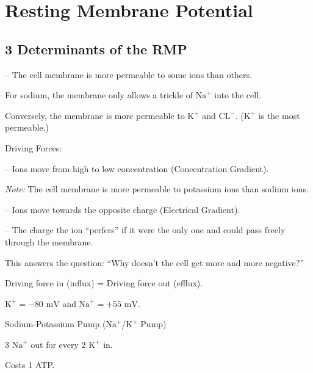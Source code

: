 \section{Resting Membrane Potential}

\subsection{3 Determinants of the RMP}

\begin{coloredlist}
    \item {} -- The cell membrane is more permeable to some ions than others.
    \begin{coloredlist}
        \item For sodium, the membrane only allows a trickle of \(\text{Na}^{+}\) into the cell.
        \item Conversely, the membrane is more permeable to \(\text{K}^{+}\) and \(\text{CL}^{-}\). (\(\text{K}^{+}\) is the most permeable.)
    \end{coloredlist}
    \item Driving Forces:
    \begin{coloredlist}
        \item {} -- Ions move from high to low concentration (Concentration Gradient).
        \begin{coloredlist}
            \item \textit{Note:} The cell membrane is more permeable to potassium ions than sodium ions.
        \end{coloredlist}
        \item {} -- Ions move towards the opposite charge (Electrical Gradient).
        \item {} -- The charge the ion ``perfers'' if it were the only one and could pass freely through the membrane.
        \begin{coloredlist}
            \item This answers the question: ``Why doesn't the cell get more and more negative?''
            \item Driving force in (influx) = Driving force out (efflux).
            \item \(\text{K}^+ = -80 \text{ mV}\) and \(\text{Na}^+ = +55 \text{ mV}\).
        \end{coloredlist}
    \end{coloredlist}
    \item Sodium-Potassium Pump (\(\text{Na}^{+}\)/\(\text{K}^{+}\) Pump)
    \begin{coloredlist}
        \item 3 \(\text{Na}^{+}\) out for every 2 \(\text{K}^{+}\) in.
        \item Costs 1 ATP.
    \end{coloredlist}
    
\end{coloredlist}